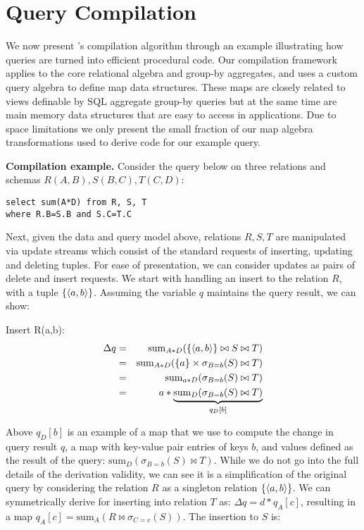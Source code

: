 
\section{Query Compilation}

\def\algsum{\mathrm{sum}}
\def\algagg{\mathrm{agg}}
\def\algtop{\mathrm{top}}
\def\algtopk{\mathrm{topk}}

\def\algsumr{\mbox{sumr}}
\def\algsumf{\mbox{sumf}}
\def\distinct{\mbox{distinct}}
\def\routerjoin{\bowtie\!=}

We now present \compiler's compilation algorithm through an example
illustrating how queries are turned into efficient procedural code. Our
compilation framework applies to the core relational algebra and group-by
aggregates, and uses a custom query algebra to define map data structures. These
maps are closely related to views definable by SQL aggregate group-by queries but
at the same time are main memory data structures that are easy to access in
applications. Due to space limitations we only present the small fraction
of our map algebra transformations used to derive code for our example query.

\noindent\textbf{Compilation example.} Consider the query below on three
relations and schemas $R(A,B), S(B,C), T(C,D)$:

\begin{verbatim}
select sum(A*D) from R, S, T
where R.B=S.B and S.C=T.C
\end{verbatim}

Next, given the data and query model above, relations $R, S, T$ are
manipulated via update streams which consist of the standard requests
of inserting, updating and deleting tuples. For ease of presentation, we can
consider updates as pairs of delete and insert requests. We start with handling
an insert to the relation $R$, with a tuple $\{{\langle a,b\rangle}\}$. Assuming
the variable $q$ maintains the query result, we can show:

\smallskip
Insert R(a,b):
\begin{eqnarray*}
\Delta q &=& \algsum_{A*D}(\{\tuple{a,b}\} \bowtie S \bowtie T)
\\ &=&
\algsum_{A*D}(\{a\} \times \sigma_{B=b}(S) \bowtie T)
\\ &=&
\algsum_{a*D}(\sigma_{B=b}(S) \bowtie T)
\\ &=&
a * \underbrace{\algsum_{D}(\sigma_{B=b}(S) \bowtie T)}_{q_D[b]}
\end{eqnarray*}

Above $q_D[b]$ is an example of a map that we use to compute the change in query
result $q$, a map with key-value pair entries of keys $b$, and values defined as
the result of the query: $\algsum_{D}(\sigma_{B=b}(S) \bowtie T)$. While we do
not go into the full details of the derivation validity, we can see it is a
simplification of the original query by considering the relation $R$ as a
singleton relation $\{{\langle a,b\rangle}\}$. We can symmetrically derive for inserting
into relation $T$ as: $\Delta q = d * q_A[c]$, resulting in a map
$q_A[c] = \algsum_{A}(R \bowtie \sigma_{C=c}(S))$. The insertion to $S$ is:

